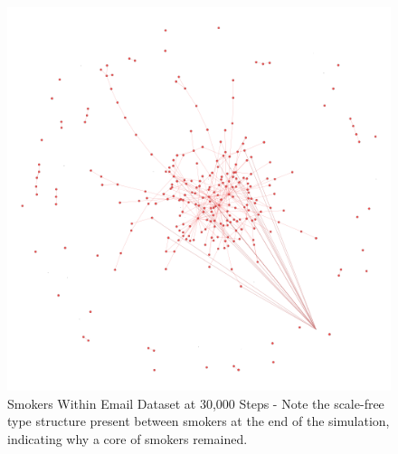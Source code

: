\documentclass[]{report}
\begin{document}
\begin{figure}
\label{img:email-smok}
\begin{center}
\includegraphics[scale=0.4]{email-smokers.png}
\end{center}
\caption{Smokers Within Email Dataset at 30,000 Steps - Note the scale-free type structure present between smokers at the end of the simulation, indicating why a core of smokers remained.}
\end{figure}
\end{document}

